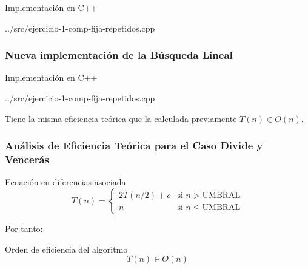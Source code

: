 \documentclass[13pt]{beamer}
\begin{document}
    \begin{frame}
        \begin{exampleblock}{Implementación en C++}
            
            {../src/ejercicio-1-comp-fija-repetidos.cpp} 
        \end{exampleblock}
    \end{frame}

    \begin{frame}
        \frametitle{Nueva implementación de la Búsqueda Lineal}

        \begin{exampleblock}{Implementación en C++}
            
{../src/ejercicio-1-comp-fija-repetidos.cpp} 
        \end{exampleblock}

        Tiene la misma eficiencia teórica que la calculada previamente $T(n) \in O(n)$. 
    \end{frame}

    \begin{frame}
        \frametitle{Análisis de Eficiencia Teórica para el Caso Divide y Vencerás}

        \begin{block}{Ecuación en diferencias asociada}
            \begin{equation}
                T(n) = \left\{ \begin{array}{lr} 2 T(n/2) + c & \text{si } n > \text{UMBRAL}\\ n & \text{si } n \leqslant \text{UMBRAL} \end{array} \right.
                \label{eq:1b-efi-dyv-rec}
            \end{equation}
        \end{block}

        Por tanto:

        \begin{alertblock}{Orden de eficiencia del algoritmo}
            \begin{equation*}
                \boxed{T(n) \in O(n)}
            \end{equation*}
        \end{alertblock}
        
    \end{frame}
\end{document}
